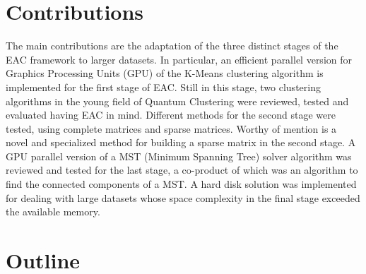 \section{Contributions}
The main contributions are the adaptation of the three distinct stages of the EAC framework to larger datasets.
In particular, an efficient parallel version for Graphics Processing Units (GPU) of the K-Means clustering algorithm is implemented for the first stage of EAC.
Still in this stage, two clustering algorithms in the young field of Quantum Clustering were reviewed, tested and evaluated having EAC in mind. %
Different methods for the second stage were tested, using complete matrices and sparse matrices.%
Worthy of mention is a novel and specialized method for building a sparse matrix in the second stage. %
A GPU parallel version of a MST (Minimum Spanning Tree) solver algorithm was reviewed and tested for the last stage, a co-product of which was an algorithm to find the connected components of a MST.
A hard disk solution was implemented for dealing with large datasets whose space complexity in the final stage exceeded the available memory.





\section{Outline}

